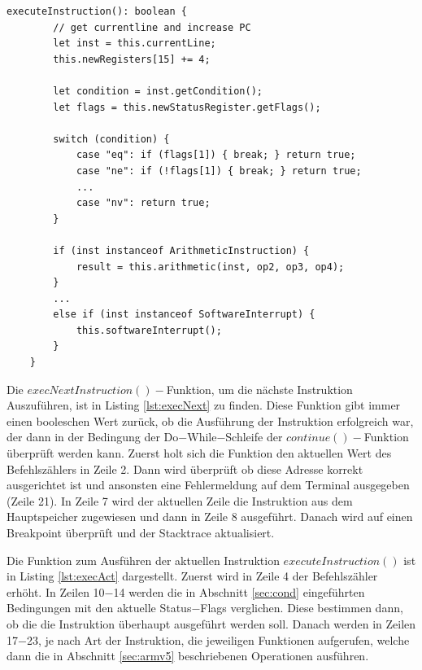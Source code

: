 \documentclass[a4paper, 11pt, onecolumn]{article}
\begin{document}
\begin{lstlisting}[style=JavaScript, basicstyle=\footnotesize, backgroundcolor=\color{backcolour}, caption={[Funktion $-$ Ausführen einer beliebigen Instruktion]Funktion zum Ausführen der aktuellen Instruktion je nach Art der Instruktion}, captionpos=b, label={lst:execAct}]
executeInstruction(): boolean {
        // get currentline and increase PC
        let inst = this.currentLine;
        this.newRegisters[15] += 4;

        let condition = inst.getCondition();
        let flags = this.newStatusRegister.getFlags();

        switch (condition) {
            case "eq": if (flags[1]) { break; } return true;
            case "ne": if (!flags[1]) { break; } return true;
            ...
            case "nv": return true;
        }
        
        if (inst instanceof ArithmeticInstruction) {
        	result = this.arithmetic(inst, op2, op3, op4);
        }
        ...
        else if (inst instanceof SoftwareInterrupt) {
            this.softwareInterrupt();
        }
    }
\end{lstlisting}

Die $execNextInstruction()-$Funktion, um die nächste Instruktion Auszuführen, ist in Listing \ref{lst:execNext} zu finden. Diese Funktion gibt immer einen booleschen Wert zurück, ob die Ausführung der Instruktion erfolgreich war, der dann in der Bedingung der Do$-$While$-$Schleife der $continue()-$Funktion überprüft werden kann. Zuerst holt sich die Funktion den aktuellen Wert des Befehlszählers in Zeile 2. Dann wird überprüft ob diese Adresse korrekt ausgerichtet ist und ansonsten eine Fehlermeldung auf dem Terminal ausgegeben (Zeile 21). In Zeile 7 wird der aktuellen Zeile die Instruktion aus dem Hauptspeicher zugewiesen und dann in Zeile 8 ausgeführt. Danach wird auf einen Breakpoint überprüft und der Stacktrace aktualisiert.

Die Funktion zum Ausführen der aktuellen Instruktion $executeInstruction()$ ist in Listing \ref{lst:execAct} dargestellt. Zuerst wird in Zeile 4 der Befehlszähler erhöht. In Zeilen 10$-$14 werden die in Abschnitt \ref{sec:cond} eingeführten Bedingungen mit den aktuelle Status$-$Flags verglichen. Diese bestimmen dann, ob die die Instruktion überhaupt ausgeführt werden soll. Danach werden in Zeilen 17$-$23, je nach Art der Instruktion, die jeweiligen Funktionen aufgerufen, welche dann die in Abschnitt \ref{sec:armv5} beschriebenen Operationen ausführen.
\end{document}
